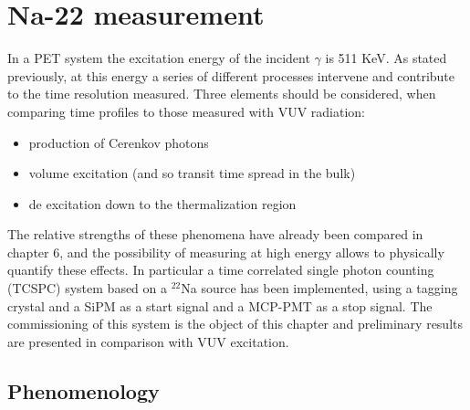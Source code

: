 \chapter{Na-22 measurement}

In a PET system the excitation energy of the incident $\gamma$ is 511 KeV. As stated previously, at this energy a series of different processes intervene and contribute to the time resolution measured.
Three elements should be considered, when comparing time profiles to those measured with VUV radiation:
\begin{itemize}
\item production of Cerenkov photons
\item volume excitation (and so transit time spread in the bulk)
\item de excitation down to the thermalization region
\end{itemize}
The relative strengths of these phenomena have already been compared in chapter 6, and the possibility of measuring at high energy allows to physically quantify these effects.
In particular a time correlated single photon counting (TCSPC) system based on a $^{22}$Na source has been implemented, using a tagging crystal and a SiPM as a start signal and a MCP-PMT as a stop signal. The commissioning of this system is the object of this chapter and preliminary results are presented in comparison with VUV excitation.

\section{Phenomenology}

